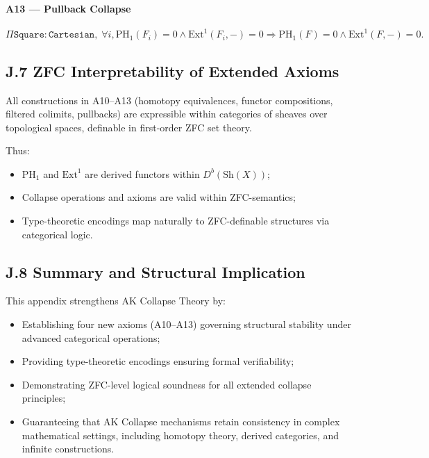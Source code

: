 \documentclass[11pt]{article}
\begin{document}
\paragraph{A13 — Pullback Collapse}
\[
\Pi \texttt{Square} : \texttt{Cartesian}, \;
\forall i, \mathrm{PH}_1(F_i) = 0 \wedge \mathrm{Ext}^1(F_i, -) = 0 \Rightarrow \mathrm{PH}_1(F) = 0 \wedge \mathrm{Ext}^1(F, -) = 0.
\]

\subsection*{J.7 ZFC Interpretability of Extended Axioms}

All constructions in A10–A13 (homotopy equivalences, functor compositions, filtered colimits, pullbacks) are expressible within categories of sheaves over topological spaces, definable in first-order ZFC set theory.

Thus:

\begin{itemize}
    \item \( \mathrm{PH}_1 \) and \( \mathrm{Ext}^1 \) are derived functors within \( D^b(\mathrm{Sh}(X)) \);
    \item Collapse operations and axioms are valid within ZFC-semantics;
    \item Type-theoretic encodings map naturally to ZFC-definable structures via categorical logic.
\end{itemize}

\subsection*{J.8 Summary and Structural Implication}

This appendix strengthens AK Collapse Theory by:

\begin{itemize}
    \item Establishing four new axioms (A10–A13) governing structural stability under advanced categorical operations;
    \item Providing type-theoretic encodings ensuring formal verifiability;
    \item Demonstrating ZFC-level logical soundness for all extended collapse principles;
    \item Guaranteeing that AK Collapse mechanisms retain consistency in complex mathematical settings, including homotopy theory, derived categories, and infinite constructions.
\end{itemize}
\end{document}
